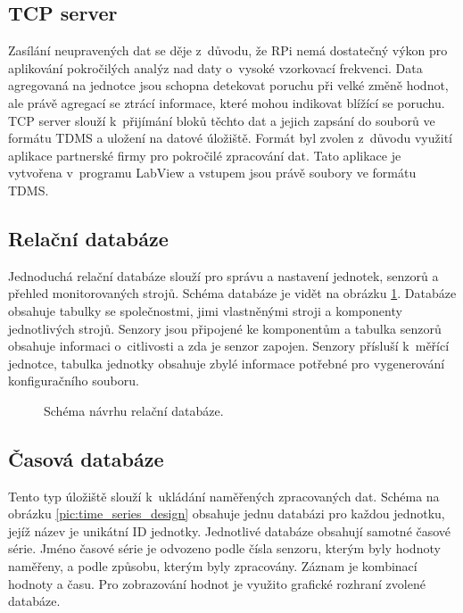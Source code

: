 \subsection{TCP server}\label{subsec:tcp_server_design}
Zasílání neupravených dat se děje z~důvodu, že RPi nemá dostatečný výkon pro aplikování pokročilých analýz nad daty o~vysoké vzorkovací frekvenci. Data agregovaná na jednotce jsou schopna detekovat poruchu při velké změně hodnot, ale právě agregací se ztrácí informace, které mohou indikovat blížící se poruchu. TCP server slouží k~přijímání bloků těchto dat a jejich zapsání do souborů ve formátu TDMS a uložení na datové úložiště. Formát byl zvolen z~důvodu využití aplikace partnerské firmy pro pokročilé zpracování dat. Tato aplikace je vytvořena v~programu LabView a vstupem jsou právě soubory ve formátu TDMS.

\subsection{Relační databáze}\label{subsec:relation_db}
Jednoduchá relační databáze slouží pro správu a nastavení jednotek, senzorů a přehled monitorovaných strojů. Schéma databáze je vidět na obrázku \ref{pic:relation_design}. Databáze obsahuje tabulky se společnostmi, jimi vlastněnými stroji a komponenty jednotlivých strojů. Senzory jsou připojené ke komponentům a tabulka senzorů obsahuje informaci o~citlivosti a zda je senzor zapojen. Senzory přísluší k~měřící jednotce, tabulka jednotky obsahuje zbylé informace potřebné pro vygenerování konfiguračního souboru.

\begin{figure}[h]
  \centering
  \caption{Schéma návrhu relační databáze.}\label{pic:relation_design}
\end{figure}

\subsection{Časová databáze}
Tento typ úložiště slouží k~ukládání naměřených zpracovaných dat. Schéma na obrázku \ref{pic:time_series_design} obsahuje jednu databázi pro každou jednotku, jejíž název je unikátní ID jednotky. Jednotlivé databáze obsahují samotné časové série. Jméno časové série je odvozeno podle čísla senzoru, kterým byly hodnoty naměřeny, a podle způsobu, kterým byly zpracovány. Záznam je kombinací hodnoty a času. Pro zobrazování hodnot je využito grafické rozhraní zvolené databáze.

